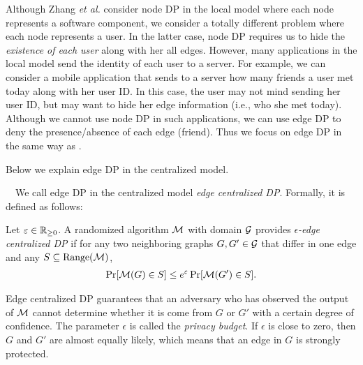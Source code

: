 Although Zhang \textit{et al.} \cite{Zhang_USENIX20} consider node DP in the local model where each node represents a software component, we consider a totally different problem where each node represents a user. 
In the latter case, 
node DP requires us to hide the \textit{existence of each user} along with her all edges. 
However, many applications in the local model send the identity of each user to a server. 
For example, 
we can consider a mobile application 
that sends to a server how many friends a user met today along with her user ID. 
In this case, the user may not mind sending her user ID, 
but may want to hide her edge information (i.e., who she met today). 
Although we cannot use node DP in such applications, we can use edge DP to deny the presence/absence of each edge (friend). 
Thus we focus on edge DP in the same way as \cite{Qin_CCS17,Sun_CCS19,Ye_ICDE20,Ye_TKDE21}. 

Below we explain edge DP in the centralized model. 

\smallskip
{}~~We call edge DP in the centralized model \textit{edge centralized DP}. 
Formally, it is defined as follows:

\begin{definition}  \label{chap1-def:edge_CDP} 
Let $\varepsilon \in \mathbb{R}_{\ge0}$. 
A randomized algorithm $\mathcal{M}$ with domain $\mathcal{G}$ provides \emph{$\epsilon$-edge centralized DP} 
if for any two 
neighboring 
graphs $G, G' \in \mathcal{G}$ that differ in one edge and any $S \subseteq \mathrm{Range}(\mathcal{M})$, 
\begin{align}
\Pr[\mathcal{M}(G) \in S] \leq e^\varepsilon \Pr[\mathcal{M}(G') \in S].
\label{chap1-eq:edge_CDP}
\end{align}
\end{definition}
Edge centralized DP guarantees that an adversary who has observed the output of $\mathcal{M}$ cannot determine whether it is come from $G$ or $G'$ with a certain degree of confidence. 
The parameter $\epsilon$ is called the \textit{privacy budget}. 
If $\epsilon$ is close to zero, then $G$ and $G'$ are almost equally likely, which means that an edge in $G$ is strongly protected. 

